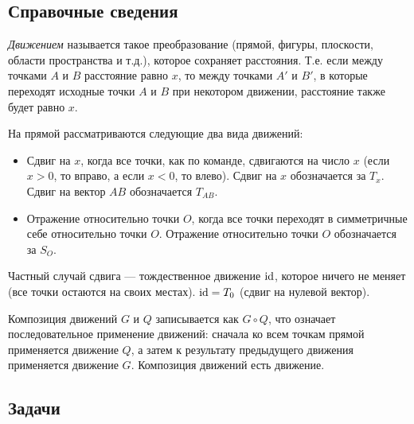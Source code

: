 \subsection*{Справочные сведения}

\textit{Движением} называется такое преобразование (прямой, фигуры, плоскости, области пространства и т.д.), которое сохраняет расстояния. Т.е. если между точками $A$ и $B$ расстояние равно $x$, то между точками $A'$ и $B'$, в которые переходят исходные точки $A$ и $B$ при некотором движении, расстояние также будет равно $x$.

На прямой рассматриваются следующие два вида движений:
\begin{itemize}
\item Сдвиг на $x$, когда все точки, как по команде, сдвигаются на число $x$ (если $x>0$, то вправо, а если $x<0$, то влево). Сдвиг на $x$ обозначается за $T_x$. Сдвиг на вектор $AB$ обозначается $T_{AB}$.
\item Отражение относительно точки $O$, когда все точки переходят в симметричные себе относительно точки $O$. Отражение относительно точки $O$ обозначается за $S_O$.
\end{itemize}

Частный случай сдвига --- тождественное движение $\mathrm{id}$, которое ничего не меняет (все точки остаются на своих местах). $\mathrm{id}=T_0$ (сдвиг на нулевой вектор).

Композиция движений $G$ и $Q$ записывается как $G\circ Q$, что означает последовательное применение движений: сначала ко всем точкам прямой применяется движение $Q$, а затем к результату предыдущего движения применяется движение $G$. Композиция движений есть движение.



\subsection*{Задачи}

